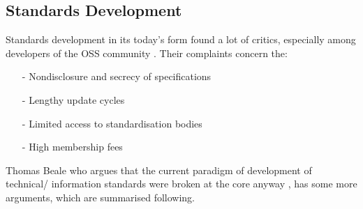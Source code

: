 %
%
%
%
%
%
%

\subsection{Standards Development}
\label{standards_development_heading}

Standards development in its today's form found a lot of critics, especially
among developers of the OSS community \cite{openehrtechnical}. Their complaints
concern the:

\begin{itemize}
    \item[-] Nondisclosure and secrecy of specifications
    \item[-] Lengthy update cycles
    \item[-] Limited access to standardisation bodies
    \item[-] High membership fees
\end{itemize}

Thomas Beale who argues that the current paradigm of development of technical/
information standards were broken at the core anyway \cite{openehrtechnical},
has some more arguments, which are summarised following.





